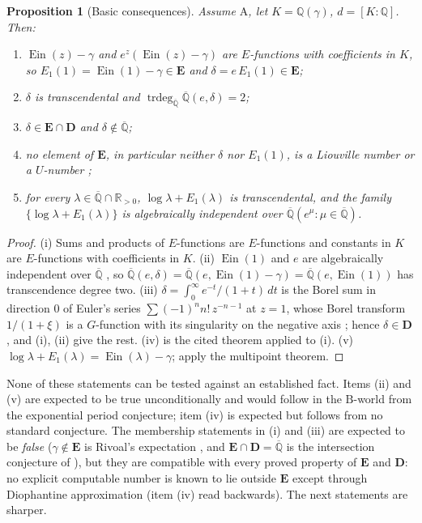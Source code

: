 \documentclass[11pt,a4paper]{article}
\newcommand{\Q}{\mathbb Q}
\newcommand{\R}{\mathbb R}
\newcommand{\Qbar}{\overline{\mathbb Q}}
\newcommand{\Ein}{\operatorname{Ein}}
\newcommand{\EE}{\mathbf E}
\newcommand{\DD}{\mathbf D}
\DeclareMathOperator{\trdeg}{trdeg}
\newtheorem{proposition}[theorem]{Proposition}
\theoremstyle{definition}
\theoremstyle{remark}
\numberwithin{equation}{section}
\begin{document}
\begin{proposition}[Basic consequences]\label{I:prop:A-basic}
Assume $\mathrm A$, let $K=\Q(\gamma)$, $d=[K:\Q]$. Then:
\begin{enumerate}[label=(\roman*)]
\item $\Ein(z)-\gamma$ and $e^z(\Ein(z)-\gamma)$ are $E$-functions with coefficients in
$K$, so $E_1(1)=\Ein(1)-\gamma\in\EE$ and $\delta=e\,E_1(1)\in\EE$;
\item $\delta$ is transcendental and $\trdeg_{\Qbar}\Qbar(e,\delta)=2$;
\item $\delta\in\EE\cap\DD$ and $\delta\notin\Qbar$;
\item no element of $\EE$, in particular neither $\delta$ nor $E_1(1)$, is a Liouville
number or a $U$-number \cite[Cor.~1, Cor.~3]{FRliouville};
\item for every $\lambda\in\Qbar\cap\R_{>0}$, $\log\lambda+E_1(\lambda)$ is
transcendental, and the family $\{\log\lambda+E_1(\lambda)\}$ is algebraically
independent over $\Qbar(e^\mu:\mu\in\Qbar)$.
\end{enumerate}
\end{proposition}
\begin{proof}
(i) Sums and products of $E$-functions are $E$-functions and constants in $K$ are
$E$-functions with coefficients in $K$. (ii) $\Ein(1)$ and $e$ are algebraically
independent over $\Qbar$ \cite[Thm.~``Multipoint $\Ein$ input'']{M}, so
$\Qbar(e,\delta)=\Qbar(e,\Ein(1)-\gamma)=\Qbar(e,\Ein(1))$ has transcendence degree two.
(iii) $\delta=\int_0^\infty e^{-t}/(1+t)\,dt$ is the Borel sum in direction $0$ of Euler's
series $\sum(-1)^nn!\,z^{-n-1}$ at $z=1$, whose Borel transform $1/(1+\xi)$ is a
$G$-function with its singularity on the negative axis \cite[\S``The mixed-Gevrey
aperture'']{K002}; hence $\delta\in\DD$, and (i), (ii) give the rest. (iv) is the cited
theorem applied to (i). (v) $\log\lambda+E_1(\lambda)=\Ein(\lambda)-\gamma$; apply the
multipoint theorem.
\end{proof}

None of these statements can be tested against an established fact. Items (ii) and
(v) are expected to be true unconditionally and would follow in the $\mathrm B$-world
from the exponential period conjecture; item (iv) is expected but follows from no
standard conjecture. The membership statements in (i) and (iii) are expected to be
\emph{false}
($\gamma\notin\EE$ is Rivoal's expectation \cite{Rivoal2017}, and $\EE\cap\DD=\Qbar$ is
the intersection conjecture of \cite{FRmixed}), but they are compatible with every proved
property of $\EE$ and $\DD$: no explicit computable number is known to lie outside $\EE$
except through Diophantine approximation (item (iv) read backwards). The next statements
are sharper.
\end{document}

